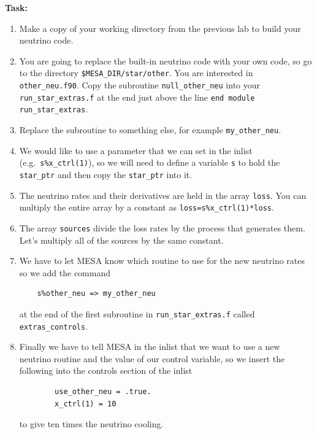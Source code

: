 \documentclass{article}
\begin{document}
\textbf{Task:}
\begin{enumerate}
 \setlength\itemsep{0em}
 \item 
Make a copy of your working directory from the previous lab to build your neutrino code.
\item 
You are going to replace the built-in neutrino code with your own code, so go to the directory \texttt{\$MESA\_DIR/star/other}.  You are interested in \texttt{other\_neu.f90}.  Copy the subroutine \texttt{null\_other\_neu} into your \texttt{run\_star\_extras.f} at the end just above the line \texttt{end module run\_star\_extras}.
\item Replace the subroutine to something else, for example \texttt{my\_other\_neu}.
\item 
We would like to use a parameter that we can set in the inlist (e.g.\ \texttt{s\%x\_ctrl(1)}), so we will need to define a variable \texttt{s} to hold the \texttt{star\_ptr} and then copy the \texttt{star\_ptr} into it.
\item 
The neutrino rates and their derivatives are held in the array \texttt{loss}.  You can multiply the entire array by a constant as \texttt{loss=s\%x\_ctrl(1)*loss}.  
\item 
The array \texttt{sources} divide the loss rates by the process that generates them.  Let's multiply all of the sources by the same constant.
\item
We have to let MESA know which routine to use for the new neutrino rates so we add the command 
\begin{verbatim}
    s%other_neu => my_other_neu
\end{verbatim}
at the end of the first subroutine in \texttt{run\_star\_extras.f} called \texttt{extras\_controls}.
\item
Finally we have to tell MESA in the inlist that we want to use a new neutrino routine and the value of our control variable, so we insert the following into the controls section of the inlist
\begin{verbatim}
        use_other_neu = .true.
        x_ctrl(1) = 10
\end{verbatim}
to give ten times the neutrino cooling.
\end{enumerate}
\end{document}
